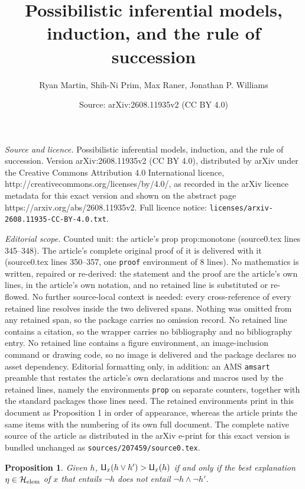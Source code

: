 \documentclass[10pt,a4paper]{amsart}
\title{Possibilistic inferential models, induction, and the rule of succession}
\author{Ryan Martin, Shih-Ni Prim, Max Raner, Jonathan P. Williams}
\date{Source: arXiv:2608.11935v2 (CC BY 4.0)}
\newtheorem{prop}{Proposition}
\renewcommand{\H}{\mathcal{H}}
\newcommand{\lPi}{\rotatebox[origin=c]{180}{$\mathsf{\Pi}$}} %
\begin{document}
\maketitle

\noindent\emph{Source and licence.} Possibilistic inferential models, induction, and the rule of succession. Version arXiv:2608.11935v2 (CC BY 4.0), distributed by arXiv under the Creative Commons Attribution 4.0 International licence, http://creativecommons.org/licenses/by/4.0/, as recorded in the arXiv licence metadata for this exact version and shown on the abstract page https://arxiv.org/abs/2608.11935v2. Full licence notice: \texttt{licenses/arxiv-2608.11935-CC-BY-4.0.txt}.\par\smallskip

\noindent\textit{Editorial scope.} Counted unit: the article's prop prop:monotone (source0.tex lines 345--348). The article's complete original proof of it is delivered with it (source0.tex lines 350--357, one \texttt{proof} environment of 8 lines). No mathematics is written, repaired or re-derived: the statement and the proof are the article's own lines, in the article's own notation, and no retained line is substituted or re-flowed.  No further source-local context is needed: every cross-reference of every retained line resolves inside the two delivered spans.  Nothing was omitted from any retained span, so the package carries no omission record.  No retained line contains a citation, so the wrapper carries no bibliography and no bibliography entry.  No retained line contains a figure environment, an image-inclusion command or drawing code, so no image is delivered and the package declares no asset dependency.  Editorial formatting only, in addition: an AMS \texttt{amsart} preamble that restates the article's own declarations and macros used by the retained lines, namely the environments \texttt{prop} on separate counters, together with the standard packages those lines need.  The retained environments print in this document as Proposition 1 in order of appearance, whereas the article prints the same items with the numbering of its own full document.  The complete native source of the article as distributed in the arXiv e-print for this exact version is bundled unchanged as \texttt{sources/207459/source0.tex}.
\begin{prop}
\label{prop:monotone}
Given $h$, $\lPi_x(h \lor h') > \lPi_x(h)$ if and only if the best explanation $\eta \in \H_\text{\rm elem}$ of $x$ that entails $\neg h$ does not entail $\neg h \land \neg h'$.
\end{prop}
\end{document}
